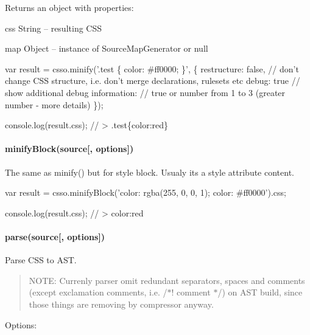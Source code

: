 Returns an object with properties\+:


\begin{DoxyItemize}
\item css {\ttfamily String} – resulting C\+SS
\item map {\ttfamily Object} – instance of {\ttfamily Source\+Map\+Generator} or {\ttfamily null}
\end{DoxyItemize}


\begin{DoxyCode}
var result = csso.minify('.test \{ color: #ff0000; \}', \{
    restructure: false,   // don't change CSS structure, i.e. don't merge declarations, rulesets etc
    debug: true           // show additional debug information:
                          // true or number from 1 to 3 (greater number - more details)
\});

console.log(result.css);
// > .test\{color:red\}
\end{DoxyCode}


\paragraph*{minify\+Block(source\mbox{[}, options\mbox{]})}

The same as {\ttfamily minify()} but for style block. Usualy it\textquotesingle{}s a {\ttfamily style} attribute content.


\begin{DoxyCode}
var result = csso.minifyBlock('color: rgba(255, 0, 0, 1); color: #ff0000').css;

console.log(result.css);
// > color:red
\end{DoxyCode}


\paragraph*{parse(source\mbox{[}, options\mbox{]})}

Parse C\+SS to A\+ST.

\begin{quote}
N\+O\+TE\+: Currenly parser omit redundant separators, spaces and comments (except exclamation comments, i.\+e. {\ttfamily /$\ast$! comment $\ast$/}) on A\+ST build, since those things are removing by compressor anyway. \end{quote}


Options\+:


